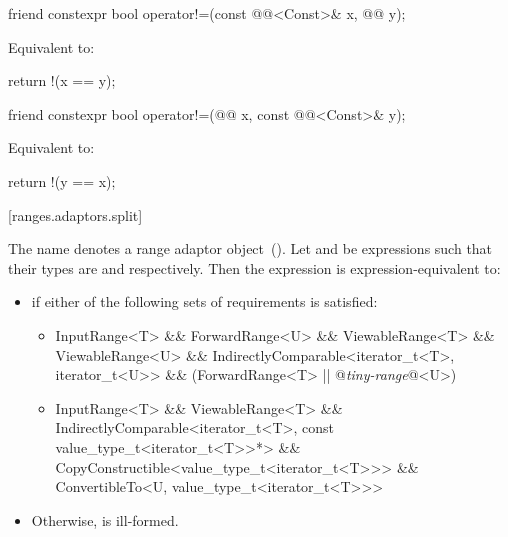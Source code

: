 %
\begin{itemdecl}
friend constexpr bool operator!=(const @@<Const>& x, @@ y);
\end{itemdecl}

\begin{itemdescr}
\pnum
\effects Equivalent to:
\begin{codeblock}
return !(x == y);
\end{codeblock}
\end{itemdescr}

%
\begin{itemdecl}
friend constexpr bool operator!=(@@ x, const @@<Const>& y);
\end{itemdecl}

\begin{itemdescr}
\pnum
\effects Equivalent to:
\begin{codeblock}
return !(y == x);
\end{codeblock}
\end{itemdescr}

[ranges.adaptors.split]{}

\pnum
The name  denotes a range adaptor object~().
Let  and  be expressions such that their types are 
and  respectively. Then the expression  is
expression-equivalent to:

\begin{itemize}
\item {} if either of the following sets of requirements
is satisfied:
\begin{itemize}
\item \begin{codeblock}
InputRange<T> && ForwardRange<U> &&
ViewableRange<T> && ViewableRange<U> &&
IndirectlyComparable<iterator_t<T>, iterator_t<U>> &&
(ForwardRange<T> || @\textit{tiny-range}@<U>)
\end{codeblock}

\item \begin{codeblock}
InputRange<T> && ViewableRange<T> &&
IndirectlyComparable<iterator_t<T>, const value_type_t<iterator_t<T>>*> &&
CopyConstructible<value_type_t<iterator_t<T>>> &&
ConvertibleTo<U, value_type_t<iterator_t<T>>>
\end{codeblock}
\end{itemize}
\item Otherwise,  is ill-formed.
\end{itemize}

